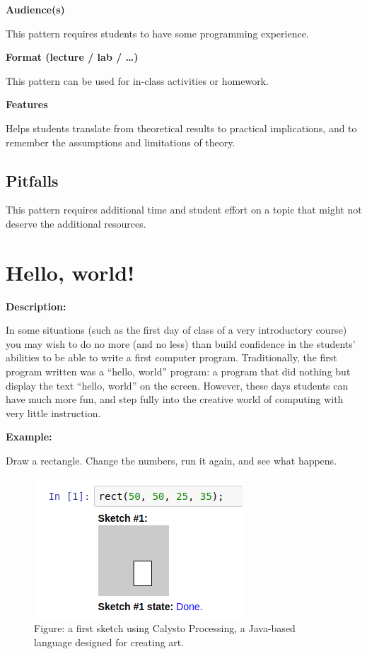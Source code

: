 \documentclass[]{book}
\begin{document}
\textbf{Audience(s)}

This pattern requires students to have some programming experience.

\textbf{Format (lecture / lab / \ldots{})}

This pattern can be used for in-class activities or homework.

\textbf{Features}

Helps students translate from theoretical results to practical
implications, and to remember the assumptions and limitations of theory.

\subsection{Pitfalls}\label{pitfalls}

This pattern requires additional time and student effort on a topic that
might not deserve the additional resources.

\section{Hello, world!}\label{hello-world}

\textbf{Description:}

In some situations (such as the first day of class of a very
introductory course) you may wish to do no more (and no less) than build
confidence in the students' abilities to be able to write a first
computer program. Traditionally, the first program written was a
``hello, world'' program: a program that did nothing but display the
text ``hello, world'' on the screen. However, these days students can
have much more fun, and step fully into the creative world of computing
with very little instruction.

\textbf{Example:}

Draw a rectangle. Change the numbers, run it again, and see what
happens.

\begin{figure}
\centering
\includegraphics{images/processing.png}
\caption{Figure: a first sketch using Calysto Processing, a Java-based
language designed for creating art.}
\end{figure}
\end{document}

